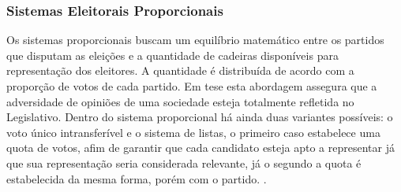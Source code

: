 \subsubsection{Sistemas Eleitorais Proporcionais}
Os sistemas proporcionais buscam um equilíbrio matemático entre os partidos
que disputam as eleições e a quantidade de cadeiras disponíveis para representação
dos eleitores. A quantidade é distribuída de acordo com a proporção de votos de
cada partido. Em tese esta abordagem assegura que a adversidade de opiniões
de uma sociedade esteja totalmente refletida no Legislativo. Dentro do sistema
proporcional há ainda duas variantes possíveis: o voto único intransferível e o
sistema de listas, o primeiro caso estabelece uma quota de votos, afim de garantir
que cada candidato esteja apto a representar já que sua representação seria considerada
relevante, já o segundo a quota é estabelecida da mesma forma, porém com o partido.
\cite[pág. 29]{nicolau2015sistemas}.

